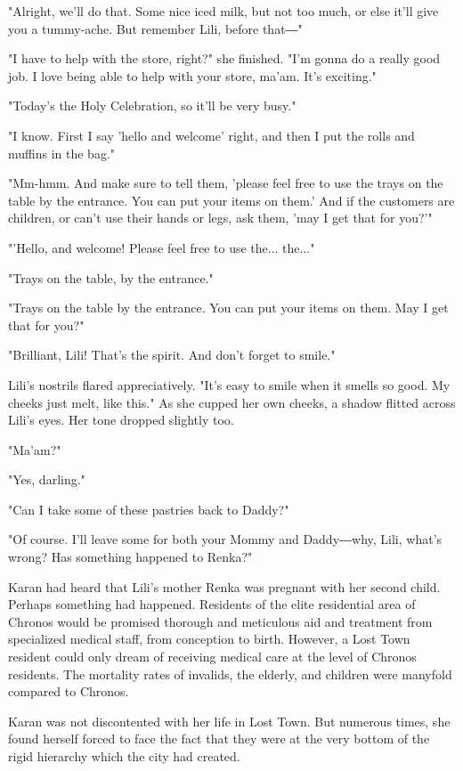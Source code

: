 "Alright, we'll do that. Some nice iced milk, but not too much, or else
it'll give you a tummy-ache. But remember Lili, before that―"

"I have to help with the store, right?" she finished. "I'm gonna do a
really good job. I love being able to help with your store, ma'am. It's
exciting."

"Today's the Holy Celebration, so it'll be very busy."

"I know. First I say 'hello and welcome' right, and then I put the rolls
and muffins in the bag."

"Mm-hmm. And make sure to tell them, 'please feel free to use the trays
on the table by the entrance. You can put your items on them.' And if
the customers are children, or can't use their hands or legs, ask them,
'may I get that for you?'"

"'Hello, and welcome! Please feel free to use the... the..."

"Trays on the table, by the entrance."

"Trays on the table by the entrance. You can put your items on them. May
I get that for you?"

"Brilliant, Lili! That's the spirit. And don't forget to smile."

Lili's nostrils flared appreciatively. "It's easy to smile when it
smells so good. My cheeks just melt, like this." As she cupped her own
cheeks, a shadow flitted across Lili's eyes. Her tone dropped slightly
too.

"Ma'am?"

"Yes, darling."

"Can I take some of these pastries back to Daddy?"

"Of course. I'll leave some for both your Mommy and Daddy―why, Lili,
what's wrong? Has something happened to Renka?"

Karan had heard that Lili's mother Renka was pregnant with her second
child. Perhaps something had happened. Residents of the elite
residential area of Chronos would be promised thorough and meticulous
aid and treatment from specialized medical staff, from conception to
birth. However, a Lost Town resident could only dream of receiving
medical care at the level of Chronos residents. The mortality rates of
invalids, the elderly, and children were manyfold compared to Chronos.

Karan was not discontented with her life in Lost Town. But numerous
times, she found herself forced to face the fact that they were at the
very bottom of the rigid hierarchy which the city had created.

